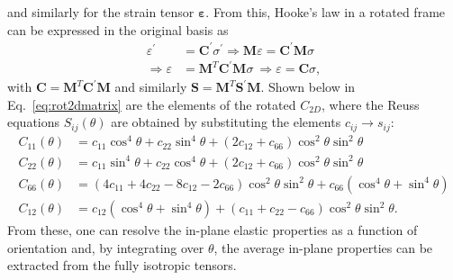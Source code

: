 %
and similarly for the strain tensor $\boldsymbol{\varepsilon}$.
%
From this, Hooke's law in a rotated frame 
can be expressed in the original basis as 
%
\begin{align}
{\varepsilon^\prime}&=\boldsymbol{C^\prime}{\sigma^\prime}
\Rightarrow
\boldsymbol{M}{\varepsilon}=\boldsymbol{C^\prime}\boldsymbol{M}{\sigma}\\
\Rightarrow
{\varepsilon}&=\boldsymbol{M}^T\boldsymbol{C^\prime}\boldsymbol{M}{\sigma}\ 
\Rightarrow
{\varepsilon}=\boldsymbol{C}{\sigma},
\end{align}
%
with  
$\boldsymbol{C}=\boldsymbol{M}^T\boldsymbol{C}^\prime \boldsymbol{M}$ 
and similarly 
$\boldsymbol{S}=\boldsymbol{M}^T\boldsymbol{S}^\prime \boldsymbol{M}$.
%
Shown below in Eq.~\ref{eq:rot2dmatrix} 
are the elements of the rotated $C_{2D}$, 
where the Reuss equations $S_{ij}\left(\theta\right)$ 
are obtained by 
substituting the elements $c_{ij}\to s_{ij}$:
%
\begin{equation}
\begin{aligned}
C_{11}\left(\theta\right)&=c_{11}\cos^4\theta+c_{22}\sin^4\theta
                +(2c_{12}+c_{66})\cos^2\theta\sin^2\theta\\
C_{22}\left(\theta\right)&=c_{11}\sin^4\theta+c_{22}\cos^4\theta
                +(2c_{12}+c_{66})\cos^2\theta\sin^2\theta\\
C_{66}\left(\theta\right)&=(4c_{11}+4c_{22}-8c_{12}-2c_{66})\cos^2\theta\sin^2\theta+c_{66}(\cos^4\theta+\sin^4\theta)\\
C_{12}\left(\theta\right)&=c_{12}(\cos^4\theta+\sin^4\theta)+(c_{11}+c_{22}-c_{66})\cos^2\theta\sin^2\theta.
\end{aligned}
\label{eq:rot2dmatrix}
\end{equation}
%
From these, 
one can resolve the 
in-plane elastic properties 
as a function of orientation and, 
by integrating over $\theta$, 
the average in-plane 
properties can be extracted
from the fully isotropic tensors.

